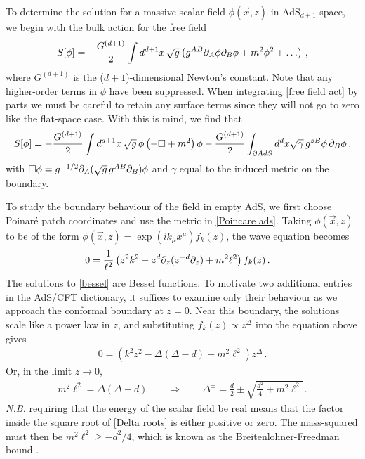 \documentclass[../PhD.tex]{subfiles}
\begin{document}
To determine the solution for a massive scalar field $\phi(\vec x, z)$ in AdS$_{d+1}$ space, we begin with the bulk action for the free field
\begin{align}
\label{free field act}
S[\phi] = -\frac{G^{(d+1)}}{2} \int d^{d+1} x \, \sqrt{g} \left( g^{AB} \partial_A \phi \partial_B \phi + m^2 \phi^2 + \ldots \right) \, ,
\end{align}
where $G^{(d+1)}$ is the ($d+1$)-dimensional Newton's constant. Note that any higher-order terms in $\phi$ have been suppressed. When integrating \eqref{free field act} by parts we must be careful to retain any surface terms since they will not go to zero like the flat-space case. With this is mind, we find that
\begin{align}
\label{action int by parts}
S[\phi] = -\frac{G^{(d+1)}}{2} \int d^{d+1}x \, \sqrt{g}\, \phi \left( - \Box + m^2 \right) \phi - \frac{G^{(d+1)}}{2}\int_{\partial AdS} d^d x \sqrt{\gamma} \, g^{zB} \phi \, \partial_B \phi \, ,
\end{align}
with $\Box \phi = g^{-1/2} \partial_A (\sqrt{g} \, g^{AB} \partial_B) \phi$ and $\gamma$ equal to the induced metric on the boundary. 

To study the boundary behaviour of the field in empty AdS, we first choose Poinar\'e patch coordinates and use the metric in \eqref{Poincare ads}. Taking $\phi(\vec x, z)$ to be of the form $\phi(\vec x, z) = \exp( i k_\mu x^\mu) f_k (z)$, the wave equation becomes
\begin{align}
\label{bessel}
0 &= \frac{1}{\ell^2} \left( z^2 k^2 - z^{d} \partial_z (z^{-d} \partial_z ) + m^2 \ell^2 \right) f_k(z) \, .
\end{align}
The solutions to \eqref{bessel} are Bessel functions. To motivate two additional entries in the AdS/CFT dictionary, it suffices to examine only their behaviour as we approach the conformal boundary at $z = 0$. Near this boundary, the solutions scale like a power law in $z$, and substituting $f_k(z) \propto z^{\Delta}$ into the equation above gives
\begin{align}
0 = \left(k^2 z^2 - \Delta(\Delta - d) + m^2 \ell^2 \right) z^\Delta \, .
\end{align}
Or, in the limit $z \to 0$,
\begin{align}
\label{Delta roots}
m^2 \ell^2 = \Delta (\Delta - d) \qquad \Rightarrow \qquad \Delta^{\pm} = \frac{d}{2} \pm \sqrt{\frac{d^2}{4} + m^2\ell^2} \, .
\end{align}
{\it N.B.} requiring that the energy of the scalar field be real means that the factor inside the square root of \eqref{Delta roots} is either positive or zero. The mass-squared must then be $m^2 \ell^2 \geq - d^2 /4$, which is known as the Breitenlohner-Freedman bound \cite{Breitenlohner:1982bm}. 
\end{document}
